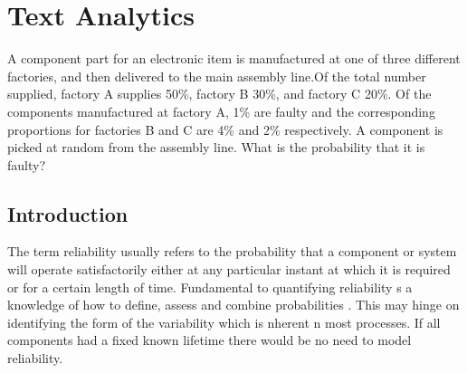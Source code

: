 \chapter{Text Analytics}

A component part for an electronic item is
manufactured at one of three different factories, and then delivered to
the main assembly line.Of the total number supplied, factory A supplies
50\%, factory B 30\%, and factory C 20\%. Of the components
manufactured at factory A, 1\% are faulty and the corresponding
proportions for factories B and C are 4\% and 2\% respectively. A
component is picked at random from the assembly line. What is the
probability that it is faulty?

\section{Introduction}\label{intro}
The term reliability usually refers to the probability that a
component or system will operate satisfactorily either at any particular
instant at which it is required or for a certain length of
time. Fundamental to quantifying reliability s a knowledge of how to
define, assess and combine probabilities \cite{Bontempi2005Adaptive}. This may hinge on identifying the
form of the variability which is nherent n most processes. If all
components had a fixed known lifetime there would be no need to model
reliability.

